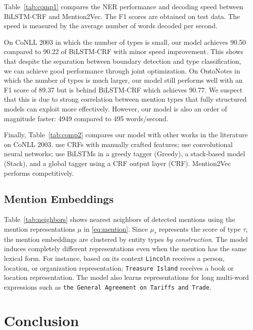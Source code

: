\documentclass[11pt,letterpaper,UTF8]{article}
\begin{document}
Table~\ref{tab:comp1} compares the NER performance and decoding speed between BiLSTM-CRF and Mention2Vec.
The F1 scores are obtained on test data.
The speed is measured by the average number of words decoded per second.



On CoNLL 2003 in which the number of types is small, our model achieves 90.50 compared to 90.22 of BiLSTM-CRF with minor speed improvement.
This shows that despite the separation between boundary detection and type classification, we can achieve good performance through joint optimization.
On OntoNotes in which the number of types is much larger, our model still performs well with an F1 score of 89.37 but is behind
BiLSTM-CRF which achieves 90.77. We suspect that this is due to strong correlation between mention types that fully structured models
can exploit more effectively.
However, our model is also an order of magnitude faster: 4949 compared to 495 words/second.


Finally, Table~\ref{tab:comp2} compares our model with other works in the literature on CoNLL 2003.
 use CRFs with manually crafted features;
 use convolutional neural networks;
 use BiLSTMs in a greedy tagger (Greedy),
a stack-based model (Stack), and a global tagger using a CRF output layer (CRF).
Mention2Vec performs competitively.

\subsection{Mention Embeddings}

Table~\ref{tab:neighbors} shows nearest neighbors of detected mentions using the mention representations $\mu$ in \eqref{eq:mention}.
Since $\mu_\tau$ represents the score of type $\tau$, the mention embeddings are clustered by entity types \textit{by construction}.
The model induces completely different representations even when the mention has the same lexical form.
For instance, based on its context \texttt{Lincoln} receives a person, location, or organization representation;
\texttt{Treasure Island} receives a book or location representation. The model also learns representations for long multi-word expressions such as
\texttt{the General Agreement on Tariffs and Trade}.

\section{Conclusion}
\label{sec:conclusion}
\end{document}
